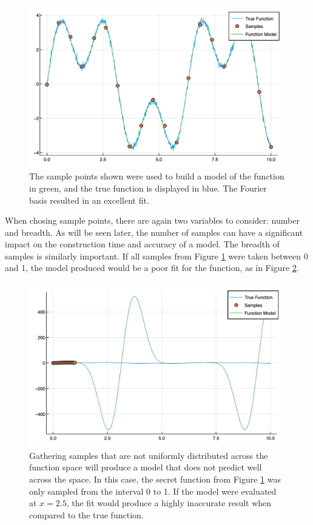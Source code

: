 \begin{figure}[h]
\includegraphics[scale = 0.27]{Figures/2dFourier}
\caption{The sample points shown were used to build a model of the function in green, and the true function is displayed in blue. The Fourier basis resulted in an excellent fit. 
\label{fig:2dFourier}} 
\end{figure}

\par When chosing sample points, there are again two variables to consider: number and breadth. As will be seen later, the number of samples can have a significant impact on the construction time and accuracy of a model. The breadth of samples is similarly important. If all samples from Figure \ref{fig:2dFourier} were taken between 0 and 1, the model produced would be a poor fit for the function, as in Figure \ref{fig:poorSamps}. 

\begin{figure}[h]
\includegraphics[scale = 0.4]{Figures/poorSamps}
\caption{Gathering samples that are not uniformly distributed across the function space will produce a model that does not predict well across the space. In this case, the secret function from Figure \ref{fig:2dFourier} was only sampled from the interval 0 to 1. If the model were evaluated at $x=2.5$, the fit would produce a highly inaccurate result when compared to the true function.
\label{fig:poorSamps}} 
\end{figure}

